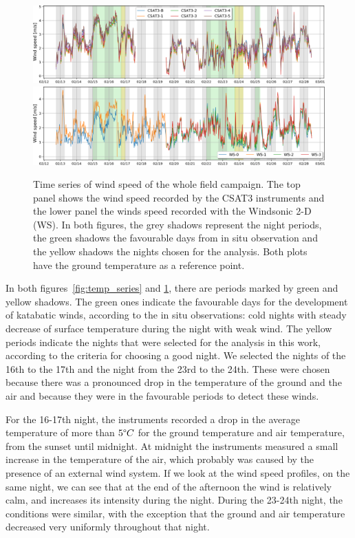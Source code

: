 \begin{figure}
  \centering
  {
  \includegraphics[width=1\textwidth]{fig/chapter_4/wind_speed_csat_series.png} \\
   \includegraphics[width=1\textwidth]{fig/chapter_4/wind_speed_ws_series.png}
   }
  \caption{Time series of wind speed of the whole field campaign. The top panel shows the wind speed recorded by the CSAT3 instruments and the lower panel the winds speed recorded with the Windsonic 2-D (WS). In both figures, the grey shadows represent the night periods, the green shadows the favourable days from in situ observation and the yellow shadows the nights chosen for the analysis. Both plots have the ground temperature as a reference point.}
  \label{fig:windspeed_series}
\end{figure}

In both figures~\ref{fig:temp_series} and \ref{fig:windspeed_series}, there are periods marked by green and yellow shadows. The green ones indicate the favourable days for the development of katabatic winds, according to the in situ observations: cold nights with steady decrease of surface temperature during the night with weak wind. The yellow periods indicate the nights that were selected for the analysis in this work, according to the criteria for choosing a good night. We selected the nights of the 16th to the 17th and the night from the 23rd to the 24th. These were chosen because there was a pronounced drop in the temperature of the ground and the air and because they were in the favourable periods to detect these winds. 

For the 16-17th night, the instruments recorded a drop in the average temperature of more than $5\degree C$ for the ground temperature and air temperature, from the sunset until midnight. At midnight the instruments measured a small increase in the temperature of the air, which probably was caused by the presence of an external wind system. If we look at the wind speed profiles, on the same night, we can see that at the end of the afternoon the wind is relatively calm, and increases its intensity during the night. During the 23-24th night, the conditions were similar, with the exception that the ground and air temperature decreased very uniformly throughout that night.

